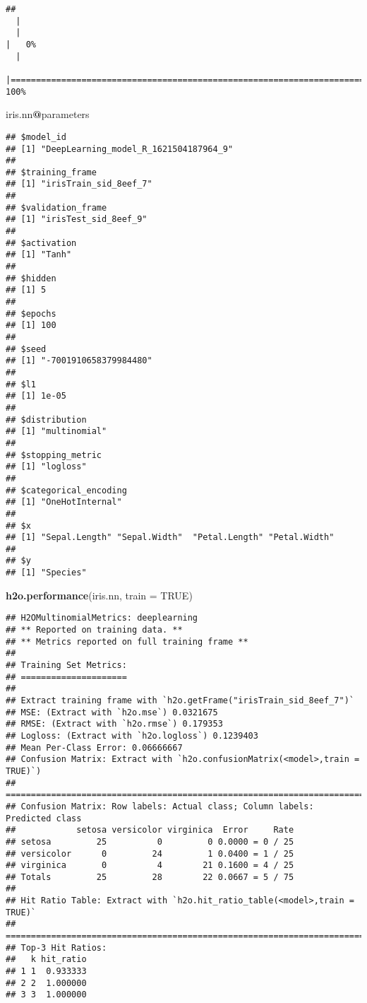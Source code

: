 \documentclass[
]{book}
\newenvironment{Shaded}{\begin{snugshade}}{\end{snugshade}}
\newcommand{\DataTypeTok}[1]{\textcolor[rgb]{0.13,0.29,0.53}{#1}}
\newcommand{\KeywordTok}[1]{\textcolor[rgb]{0.13,0.29,0.53}{\textbf{#1}}}
\newcommand{\NormalTok}[1]{#1}
\newcommand{\OperatorTok}[1]{\textcolor[rgb]{0.81,0.36,0.00}{\textbf{#1}}}
\newcommand{\OtherTok}[1]{\textcolor[rgb]{0.56,0.35,0.01}{#1}}
\begin{document}
\begin{verbatim}
## 
  |                                                                            
  |                                                                      |   0%
  |                                                                            
  |======================================================================| 100%
\end{verbatim}

\begin{Shaded}
\begin{Highlighting}[]
\NormalTok{iris.nn}\OperatorTok{@}\NormalTok{parameters}
\end{Highlighting}
\end{Shaded}

\begin{verbatim}
## $model_id
## [1] "DeepLearning_model_R_1621504187964_9"
## 
## $training_frame
## [1] "irisTrain_sid_8eef_7"
## 
## $validation_frame
## [1] "irisTest_sid_8eef_9"
## 
## $activation
## [1] "Tanh"
## 
## $hidden
## [1] 5
## 
## $epochs
## [1] 100
## 
## $seed
## [1] "-7001910658379984480"
## 
## $l1
## [1] 1e-05
## 
## $distribution
## [1] "multinomial"
## 
## $stopping_metric
## [1] "logloss"
## 
## $categorical_encoding
## [1] "OneHotInternal"
## 
## $x
## [1] "Sepal.Length" "Sepal.Width"  "Petal.Length" "Petal.Width" 
## 
## $y
## [1] "Species"
\end{verbatim}

\begin{Shaded}
\begin{Highlighting}[]
\KeywordTok{h2o.performance}\NormalTok{(iris.nn, }\DataTypeTok{train =} \OtherTok{TRUE}\NormalTok{)}
\end{Highlighting}
\end{Shaded}

\begin{verbatim}
## H2OMultinomialMetrics: deeplearning
## ** Reported on training data. **
## ** Metrics reported on full training frame **
## 
## Training Set Metrics: 
## =====================
## 
## Extract training frame with `h2o.getFrame("irisTrain_sid_8eef_7")`
## MSE: (Extract with `h2o.mse`) 0.0321675
## RMSE: (Extract with `h2o.rmse`) 0.179353
## Logloss: (Extract with `h2o.logloss`) 0.1239403
## Mean Per-Class Error: 0.06666667
## Confusion Matrix: Extract with `h2o.confusionMatrix(<model>,train = TRUE)`)
## =========================================================================
## Confusion Matrix: Row labels: Actual class; Column labels: Predicted class
##            setosa versicolor virginica  Error     Rate
## setosa         25          0         0 0.0000 = 0 / 25
## versicolor      0         24         1 0.0400 = 1 / 25
## virginica       0          4        21 0.1600 = 4 / 25
## Totals         25         28        22 0.0667 = 5 / 75
## 
## Hit Ratio Table: Extract with `h2o.hit_ratio_table(<model>,train = TRUE)`
## =======================================================================
## Top-3 Hit Ratios: 
##   k hit_ratio
## 1 1  0.933333
## 2 2  1.000000
## 3 3  1.000000
\end{verbatim}
\end{document}
